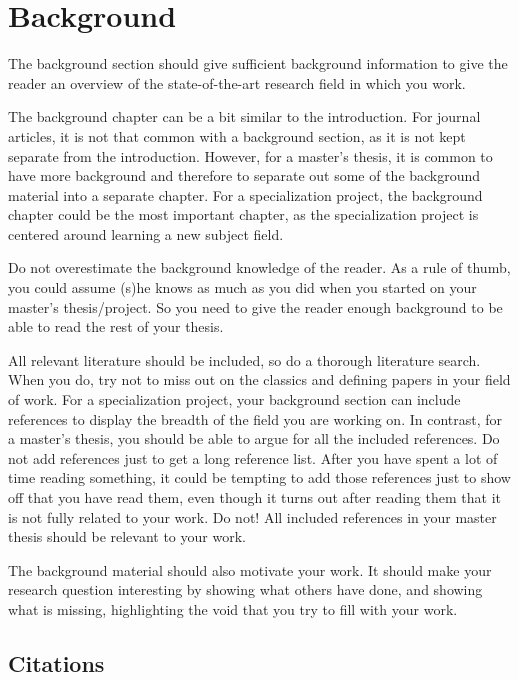 \chapter{Background}
\label{chap:Background}

The background section should give sufficient background information to give the reader an overview of the state-of-the-art research field in which you work.

The background chapter can be a bit similar to the introduction. For journal articles, it is not that common with a background section, as it is not kept separate from the introduction. However, for a master's thesis, it is common to have more background and therefore to separate out some of the background material into a separate chapter. For a specialization project, the background chapter could be the most important chapter, as the specialization project is centered around learning a new subject field.

Do not overestimate the background knowledge of the reader. As a rule of thumb, you could assume (s)he knows as much as you did when you started on your master's thesis/project. So you need to give the reader enough background to be able to read the rest of your thesis.

All relevant literature should be included, so do a thorough literature search. When you do, try not to miss out on the classics and defining papers in your field of work. For a specialization project, your background section can include references to display the breadth of the field you are working on. In contrast, for a master's thesis, you should be able to argue for all the included references. Do not add references just to get a long reference list. After you have spent a lot of time reading something, it could be tempting to add those references just to show off that you have read them, even though it turns out after reading them that it is not fully related to your work. Do not! All included references in your master thesis should be relevant to your work.

The background material should also motivate your work. It should make your research question interesting by showing what others have done, and showing what is missing, highlighting the void that you try to fill with your work.


\section{Citations}

